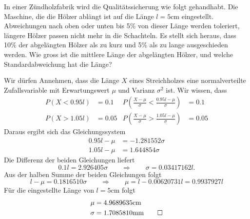 In einer Zündholzfabrik wird die Qualitätssicherung wie folgt gehandhabt.
Die Maschine, die die Hölzer ablängt ist auf die Länge $l=5\text{cm}$ eingestellt.
Abweichungen nach oben oder unten bis 5\% von dieser Länge werden toleriert,
längere Hölzer passen nicht mehr in die Schachteln. Es stellt sich
heraus, dass 10\% der abgelängten Hölzer als zu kurz und 5\% als zu
lange ausgeschieden werden. Wie gross ist die mittlere Länge der abgelängten
Hölzer, und welche Standardabweichung hat die Länge?


\begin{loesung}
Wir dürfen Annehmen, dass die Länge $X$ eines Streichholzes eine
normalverteilte Zufallsvariable mit Erwartungswert $\mu$ und Varianz
$\sigma^2$ ist. Wir wissen, dass
\begin{align*}
P(X<0.95 l)&=0.1&P\left(\frac{X-\mu}{\sigma}<\frac{0.95l-\mu}{\sigma}\right)&=0.1\\
P(X>1.05l)&=0.05&P\left(\frac{X-\mu}{\sigma}>\frac{1.05l-\mu}{\sigma}\right)&=0.05
\end{align*}
Daraus ergibt sich das Gleichungssystem
\begin{align*}
0.95l-\mu&=-1.281552\sigma\\
1.05l-\mu&=1.644854\sigma
\end{align*}
Die Differenz der beiden Gleichungen liefert
\[
0.1l=2.926405\sigma\qquad\Rightarrow\qquad
\sigma=0.03417162l.
\]
Aus der halben Summe der beiden Gleichungen folgt
\[
l-\mu=0.1816510\sigma\qquad\Rightarrow\qquad\mu=l-0.00620731l
=0.9937927l
\]
Für die eingestellte Länge von $l=5\text{cm}$ folgt
\begin{align*}
\mu&=
4.9689635
\text{cm}
\\
\sigma&=
1.7085810
\text{mm}
\qedhere
\end{align*}
\end{loesung}

